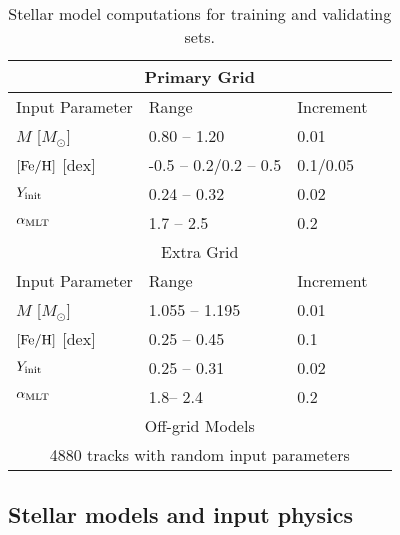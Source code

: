 \begin{table*}
	\centering
	\caption{Stellar model computations for training and validating sets.}
	\label{tab:grid}
	\begin{tabular}{llll} %
		\hline
		\multicolumn{4}{c}{Primary Grid}\\
		\hline
		Input Parameter & Range & Increment \\
        \hline
	$M$ [$M_{\odot}$]  & 0.80 -- 1.20 &  0.01&\\
        $\rm{[Fe/H]}$ [dex] & -0.5 -- 0.2/0.2 -- 0.5 & 0.1/0.05\\
        	$Y_{\rm init}$ & 0.24 -- 0.32 & 0.02&\\
        $\alpha_{\rm{MLT}}$  & 1.7 -- 2.5&  0.2&\\
        \hline
       \multicolumn{4}{c}{Extra Grid}\\
	\hline
	Input Parameter & Range & Increment \\
        \hline
	$M$ [$M_{\odot}$]  & 1.055 -- 1.195 &  0.01&\\
        $\rm{[Fe/H]}$ [dex] & 0.25 -- 0.45 & 0.1\\
        	$Y_{\rm init}$ & 0.25 -- 0.31 & 0.02&\\
        $\alpha_{\rm{MLT}}$  & 1.8-- 2.4&  0.2&\\
        \hline
        \multicolumn{4}{c}{Off-grid Models}\\
        \hline
        \multicolumn{4}{c}{4880 tracks with random input parameters }\\
	\hline
	\end{tabular}
\end{table*}

\subsection{Stellar models and input physics}\label{subsec:stellar_model}

